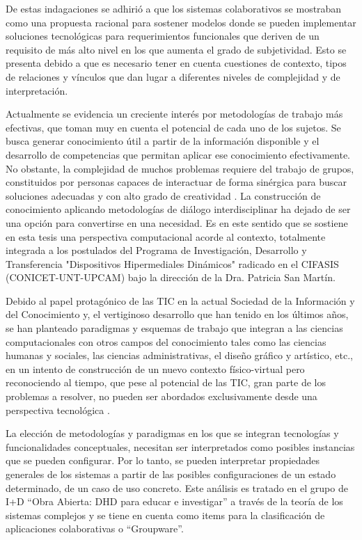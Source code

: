 De estas indagaciones se adhirió a que los sistemas colaborativos se mostraban como una propuesta racional para sostener modelos donde se pueden implementar soluciones tecnológicas para requerimientos funcionales que deriven de un requisito de más alto nivel en los que aumenta el grado de subjetividad. Esto se presenta  debido a que es necesario tener en cuenta cuestiones de contexto, tipos de relaciones y vínculos que dan lugar a diferentes niveles de complejidad y de interpretación. 

Actualmente se evidencia un creciente interés por metodologías de trabajo más efectivas, que toman muy en cuenta el potencial de cada uno de los sujetos. Se busca generar conocimiento útil a partir de la información disponible y el desarrollo de competencias que permitan aplicar ese conocimiento efectivamente. No obstante, la complejidad de muchos problemas requiere del trabajo de grupos, constituidos por personas capaces de interactuar de forma sinérgica para buscar soluciones adecuadas y con alto grado de creatividad \cite{cap1.1}. La construcción de conocimiento aplicando metodologías de diálogo interdisciplinar ha dejado de ser una opción para convertirse en una necesidad. Es en este sentido que se sostiene en esta tesis una perspectiva computacional acorde al contexto, totalmente integrada a los postulados del Programa de Investigación, Desarrollo y Transferencia "Dispositivos Hipermediales Dinámicos" radicado en el CIFASIS (CONICET-UNT-UPCAM) bajo la dirección de la Dra. Patricia San Martín. 

Debido al papel protagónico de las TIC en la actual Sociedad de la Información y del Conocimiento y, el vertiginoso desarrollo que han tenido en los últimos años, se han planteado paradigmas y esquemas de trabajo que integran a las ciencias computacionales con otros campos del conocimiento tales como las ciencias humanas
y sociales, las ciencias administrativas, el diseño gráfico y artístico, etc., en un intento de construcción de un nuevo contexto físico-virtual pero reconociendo al tiempo, que pese al
potencial de las TIC, gran parte de los problemas a resolver, no pueden ser abordados exclusivamente desde una perspectiva tecnológica \cite{cap1.2,cap1.3}. 

La elección de metodologías y paradigmas en los que se integran tecnologías y funcionalidades conceptuales, necesitan ser interpretados como posibles instancias que se pueden configurar. Por lo tanto, se pueden interpretar propiedades generales de los sistemas a partir de las posibles configuraciones de un estado determinado, de un caso de uso concreto. Este análisis es tratado
en el grupo de I+D ``Obra Abierta: DHD para educar e investigar'' a través de la teoría de los sistemas complejos y se tiene en cuenta como items para la clasificación de aplicaciones colaborativas o ``Groupware''.

